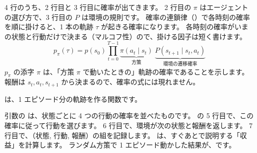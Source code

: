 4 行のうち、2 行目と 3 行目に確率が出てきます。
2 行目の $\pi$ はエージェントの選び方で、3 行目の $P$ は環境の規則です。
確率の連鎖律（）で各時刻の確率を順に掛けると、1 本の軌跡 $\tau$ が起きる確率になります。
各時刻の確率がいまの状態と行動だけで決まる（マルコフ性）ので、掛ける因子は短く書けます。
\begin{equation}
p_\pi(\tau)=p(s_0)\prod_{t=0}^{T-1}\underbrace{\pi(a_t\mid s_t)}_{\text{方策}}\;\underbrace{P(s_{t+1}\mid s_t,a_t)}_{\text{環境の遷移確率}}
\label{eq:rlb-traj-prob}
\end{equation}
$p_\pi$ の添字 $\pi$ は、「方策 $\pi$ で動いたときの」軌跡の確率であることを示します。
報酬は $s_t,a_t,s_{t+1}$ から決まるので、確率の式には現れません。

は、1 エピソード分の軌跡を作る関数です。


引数の  は、状態ごとに 4 つの行動の確率を並べたものです。
 の 5 行目で、この確率に従って行動を選びます。
6 行目で、環境が次の状態と報酬を返します。
7 行目で、（状態, 行動, 報酬）の組を記録します。
 は、すぐあとで説明する「収益」を計算します。
ランダム方策で 1 エピソード動かした結果が、です。

